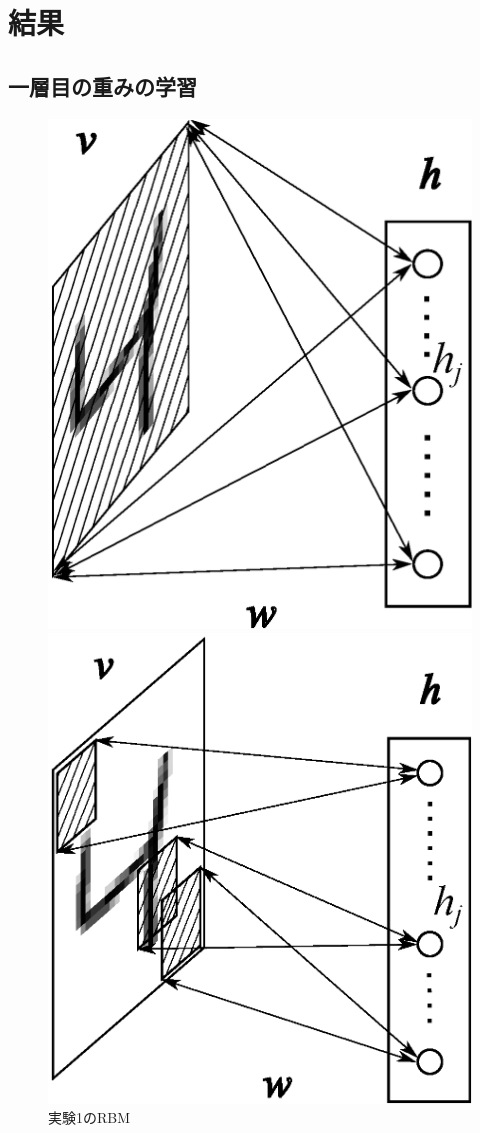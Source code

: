 \section{結果}
\subsection{一層目の重みの学習}
\begin{figure}[hbt]
\centering
\begin{minipage}{0.45\columnwidth}
  \centering
  \includegraphics[width=0.8\columnwidth]{lookall_network_v7.eps}
  \caption{実験1のRBM}
  \label{cap:lookall_network}
\end{minipage}
\begin{minipage}{0.45\columnwidth}
  \centering
  \includegraphics[width=0.9\columnwidth]{lookpartial_network_v8.eps}

\end{minipage}
\end{figure}
